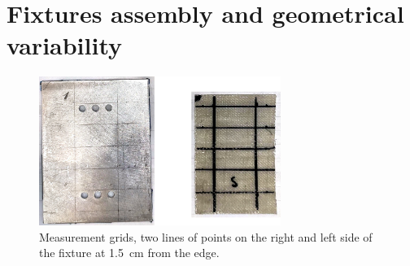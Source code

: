 \documentclass[11pt,a4paper]{article}
\begin{document}
    \section{Fixtures assembly and geometrical variability}
    \label{sec:assembly}
       \begin{figure}[!tb]
           \centering
        \includegraphics[width=0.7\textwidth]{measgrid}
        \caption{Measurement grids, two lines of points on the right and left side of the fixture at 1.5~cm from the edge.}
        \label{fig:grid}
    \end{figure}
\end{document}
